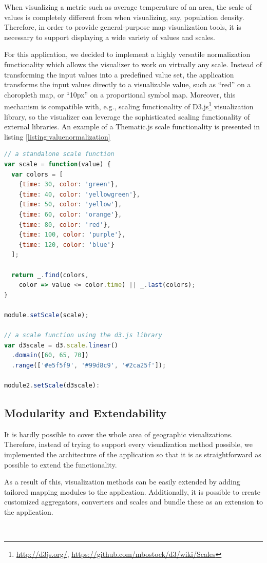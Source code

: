 When visualizing a metric such as average temperature of an area, the scale of values is completely different from when visualizing, say, population density. Therefore, in order to provide general-purpose map visualization tools, it is necessary to support displaying a wide variety of values and scales.

For this application, we decided to implement a highly versatile normalization functionality which allows the visualizer to work on virtually any scale. Instead of transforming the input values into a predefined value set, the application transforms the input values directly to a visualizable value, such as ``red'' on a choropleth map, or ``10px'' on a proportional symbol map. Moreover, this mechanism is compatible with, e.g., scaling functionality of D3.js\footnote{\url{http://d3js.org/}, \url{https://github.com/mbostock/d3/wiki/Scales}} visualization library, so the visualizer can leverage the sophisticated scaling functionality of external libraries. An example of a Thematic.js scale functionality is presented in listing \ref{listing:valuenormalization}

\begin{lstlisting}[caption=An example of Thematic.js scale functionality.,language=JavaScript,label=listing:valuenormalization]
// a standalone scale function
var scale = function(value) {
  var colors = [
    {time: 30, color: 'green'},
    {time: 40, color: 'yellowgreen'},
    {time: 50, color: 'yellow'},
    {time: 60, color: 'orange'},
    {time: 80, color: 'red'},
    {time: 100, color: 'purple'},
    {time: 120, color: 'blue'}
  ];

  return _.find(colors, 
    color => value <= color.time) || _.last(colors);
}

module.setScale(scale);

// a scale function using the d3.js library
var d3scale = d3.scale.linear()
  .domain([60, 65, 70])
  .range(['#e5f5f9', '#99d8c9', '#2ca25f']);

module2.setScale(d3scale):
\end{lstlisting}

\subsection{Modularity and Extendability}

It is hardly possible to cover the whole area of geographic visualizations. Therefore, instead of trying to support every visualization method possible, we implemented the architecture of the application so that it is as straightforward as possible to extend the functionality.

As a result of this, visualization methods can be easily extended by adding tailored mapping modules to the application. Additionally, it is possible to create customized aggregators, converters and scales and bundle these as an extension to the application.

~

